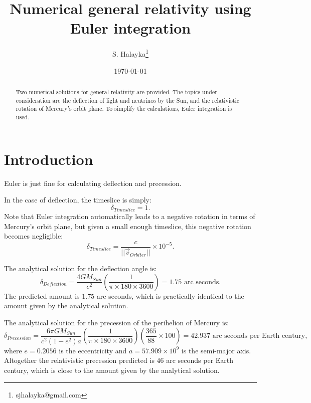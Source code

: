\documentclass[12pt]{article}
\title{Numerical general relativity using Euler integration}
\author{S. Halayka\footnote{sjhalayka@gmail.com}}
\date{\today\;\currenttime}
\begin{document}
 
\maketitle

\begin{abstract}
Two numerical solutions for general relativity are provided.
The topics under consideration are the deflection of light and neutrinos by the Sun, and the relativistic rotation of Mercury's orbit plane.
To simplify the calculations, Euler integration is used.
\end{abstract}





\section{Introduction}



Euler is just fine for calculating deflection and precession.

In the case of deflection, the timeslice is simply:
\begin{equation}
\delta_{Timeslice} = 1.
\end{equation}
Note that Euler integration automatically leads to a negative rotation in terms of Mercury's orbit plane, but given a small enough timeslice, this negative rotation becomes negligible:
\begin{equation}
\delta_{Timeslice} = \frac{c}{\lvert\lvert \vec{v}_{Orbiter} \rvert \rvert} \times 10^{-5}.
\end{equation}






The analytical solution for the deflection angle is:
\begin{equation}
\delta_{Deflection} = \frac{4GM_{Sun}}{c^2} \left( \frac{1}{\pi \times 180 \times 3600} \right) = 1.75 \textrm{ arc seconds}.
\end{equation}
The predicted amount is $1.75$ arc seconds, which is practically identical to the amount given by the analytical solution.




The analytical solution for the precession of the perihelion of Mercury is:
\begin{equation}
\delta_{Precession} = \frac{6 \pi GM_{Sun}}{c^2 (1 - e^2) a} \left( \frac{1}{ \pi \times 180 \times 3600} \right) \left( \frac{365}{88} \times 100 \right) = 42.937 \textrm{ arc seconds per Earth century},
\end{equation}
where $e = 0.2056$ is the eccentricity and $a = 57.909 \times 10^9$ is the semi-major axis.
Altogether the relativistic precession predicted is $46$ arc seconds per Earth century, which is close to the amount given by the analytical solution.
\end{document}
